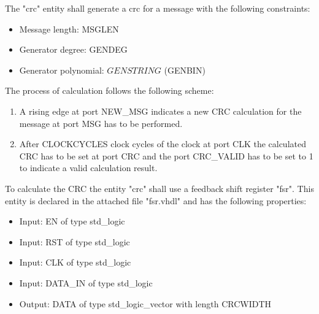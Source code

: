 \documentclass[a4paper,12pt]{article}
\begin{document}
The "crc" entity shall generate a crc for a message with the following constraints:
\begin{itemize}
\item Message length: {{MSGLEN}}
\item Generator degree: {{GENDEG}}
\item Generator polynomial: ${{GENSTRING}}$ ({{GENBIN}})
\end{itemize}
The process of calculation follows the following scheme:
\begin{enumerate}
    \item A rising edge at port NEW\_MSG indicates a new CRC calculation for the message at port MSG has to be performed.
    \item After {{CLOCKCYCLES}} clock cycles of the clock at port CLK the calculated CRC has to be set at port CRC and the port CRC\_VALID has to be set to 1 to indicate a valid calculation result.
\end{enumerate}

\newpage

To calculate the CRC the entity "crc" shall use a feedback shift register "fsr". This entity is declared in the attached file "fsr.vhdl" and has the following properties:
\begin{itemize}
    \item Input: EN of type std\_logic
    \item Input: RST of type std\_logic
    \item Input: CLK of type std\_logic
    \item Input: DATA\_IN of type std\_logic
    \item Output: DATA of type std\_logic\_vector with length {{CRCWIDTH}}
\end{itemize}

\vspace{0.5cm}

\begin{center}
\end{center}
\end{document}
